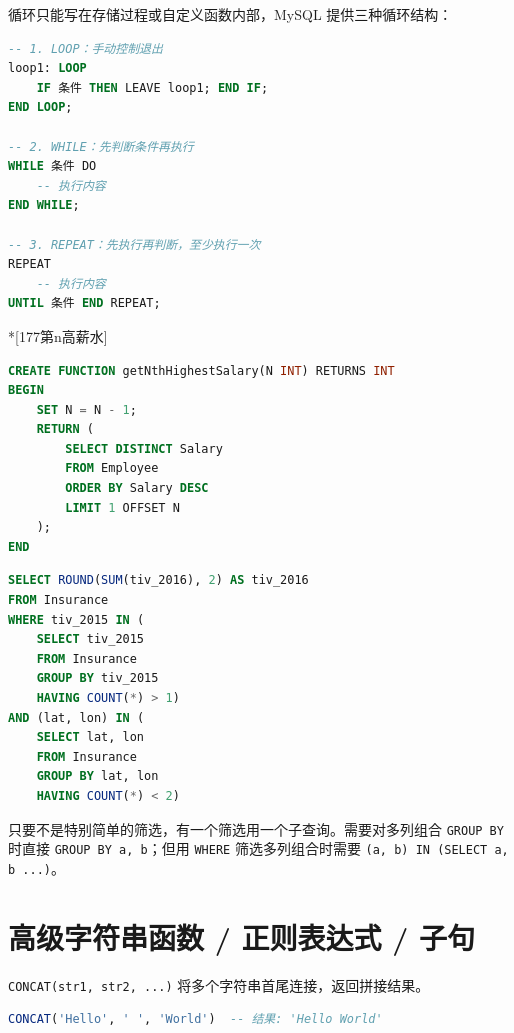 \begin{definition}[SQL 循环]
循环只能写在存储过程或自定义函数内部，MySQL 提供三种循环结构：

\begin{lstlisting}[language=SQL, frame=single, backgroundcolor=\color{white}]
-- 1. LOOP：手动控制退出
loop1: LOOP
    IF 条件 THEN LEAVE loop1; END IF;
END LOOP;

-- 2. WHILE：先判断条件再执行
WHILE 条件 DO
    -- 执行内容
END WHILE;

-- 3. REPEAT：先执行再判断，至少执行一次
REPEAT
    -- 执行内容
UNTIL 条件 END REPEAT;
\end{lstlisting}

\end{definition}

\begin{homework}
\begin{example}*[177第n高薪水]
    \begin{lstlisting}[language=SQL]
CREATE FUNCTION getNthHighestSalary(N INT) RETURNS INT
BEGIN
    SET N = N - 1;
    RETURN (
        SELECT DISTINCT Salary
        FROM Employee
        ORDER BY Salary DESC
        LIMIT 1 OFFSET N
    );
END
\end{lstlisting}
\end{example}
\end{homework}

\begin{homework}[585 | 高级查询和连接 第13题]
\begin{lstlisting}[language=SQL]
SELECT ROUND(SUM(tiv_2016), 2) AS tiv_2016
FROM Insurance
WHERE tiv_2015 IN (
    SELECT tiv_2015
    FROM Insurance
    GROUP BY tiv_2015
    HAVING COUNT(*) > 1)
AND (lat, lon) IN (
    SELECT lat, lon
    FROM Insurance
    GROUP BY lat, lon
    HAVING COUNT(*) < 2)
\end{lstlisting}
\begin{dxtips}
   只要不是特别简单的筛选，有一个筛选用一个子查询。需要对多列组合 \texttt{GROUP BY} 时直接 \texttt{GROUP BY a, b}；但用 \texttt{WHERE} 筛选多列组合时需要 \texttt{(a, b) IN (SELECT a, b ...)}。
\end{dxtips}
\end{homework}

\section{高级字符串函数 / 正则表达式 / 子句}
\begin{definition}[CONCAT 函数]
\texttt{CONCAT(str1, str2, ...)} 将多个字符串首尾连接，返回拼接结果。

\begin{lstlisting}[language=SQL, frame=single, backgroundcolor=\color{white}]
CONCAT('Hello', ' ', 'World')  -- 结果: 'Hello World'
\end{lstlisting}
\end{definition}

